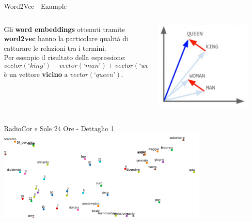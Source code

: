 \documentclass[british]{beamer}
\begin{document}
\begin{frame}{Word2Vec - Example}
	\begin{columns}
		\begin{column}{0.6\textwidth}
			Gli \textbf{word embeddings} ottenuti tramite \textbf{word2vec} hanno la particolare qualit\`{a} di catturare le relazioni tra i termini.\\
			Per esempio il risultato della espressione:
			\begin{equation*}
				vector(‘king’) - vector(‘man’) + vector(‘woman’)
			\end{equation*}
			\`{e} un vettore \textbf{vicino} a \(vector(‘queen’)\).
		\end{column}
		\begin{column}{0.4\textwidth}
			\includegraphics[width = \textwidth]{./Imgs/w2v-example.png}
		\end{column}
	\end{columns}
\end{frame}

\begin{frame}{RadioCor e Sole 24 Ore - Dettaglio 1}
	\includegraphics[width = 0.8\textwidth]{./Imgs/plot-numeri.png}
\end{frame}
\end{document}
